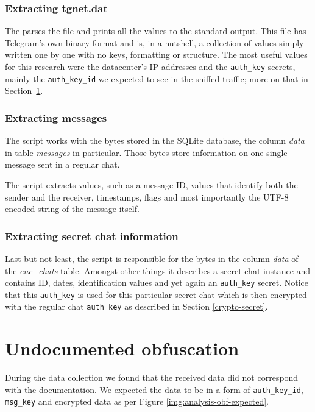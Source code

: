 \documentclass[thesis=M,english]{FITthesis}[2012/10/20]
\begin{document}
\subsubsection{Extracting tgnet.dat}

The  parses the  file and prints all the values to the standard output. This file has Telegram's own binary format and is, in a nutshell, a collection of values simply written one by one with no keys, formatting or structure. The most useful values for this research were the datacenter's IP addresses and the \texttt{auth\_key} secrets, mainly the \texttt{auth\_key\_id} we expected to see in the sniffed traffic; more on that in Section~\ref{analysis-obf}.

\subsubsection{Extracting messages}

The script  works with the bytes stored in the SQLite database, the column \emph{data} in table \emph{messages} in particular. Those bytes store information on one single message sent in a regular chat.

The script extracts values, such as a message ID, values that identify both the sender and the receiver, timestamps, flags and most importantly the UTF-8 encoded string of the message itself.

\subsubsection{Extracting secret chat information}

Last but not least, the  script is responsible for the bytes in the column \emph{data} of the \emph{enc\_chats} table. Amongst other things it describes a secret chat instance and contains ID, dates, identification values and yet again an \texttt{auth\_key} secret. Notice that this \texttt{auth\_key} is used for this particular secret chat which is then encrypted with the regular chat \texttt{auth\_key} as described in Section \ref{crypto-secret}.

\section{Undocumented obfuscation}\label{analysis-obf}

During the data collection we found that the received data did not correspond with the documentation. We expected the data to be in a form of \texttt{auth\_key\_id}, \texttt{msg\_key} and encrypted data as per Figure \ref{img:analysis-obf-expected}.
\end{document}
